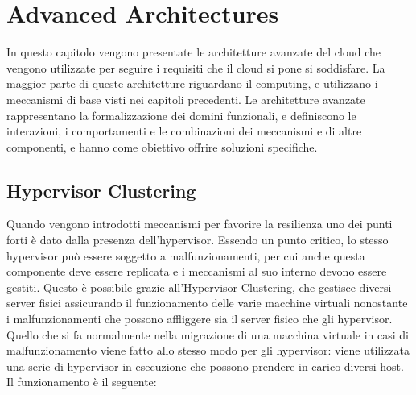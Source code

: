 \chapter{Advanced Architectures}
In questo capitolo vengono presentate le architetture avanzate del cloud che vengono utilizzate per seguire i requisiti che il cloud si pone si soddisfare. La maggior parte di queste architetture riguardano il computing, e utilizzano i meccanismi di base visti nei capitoli precedenti. Le architetture avanzate rappresentano la formalizzazione dei domini funzionali, e definiscono le interazioni, i comportamenti e le combinazioni dei meccanismi e di altre componenti, e hanno come obiettivo offrire soluzioni specifiche.

\section{Hypervisor Clustering}
Quando vengono introdotti meccanismi per favorire la resilienza uno dei punti forti è dato dalla presenza dell'hypervisor. Essendo un punto critico, lo stesso hypervisor può essere soggetto a malfunzionamenti, per cui anche questa componente deve essere replicata e i meccanismi al suo interno devono essere gestiti. Questo è possibile grazie all'Hypervisor Clustering, che gestisce diversi server fisici assicurando il funzionamento delle varie macchine virtuali nonostante i malfunzionamenti che possono affliggere sia il server fisico che gli hypervisor. Quello che si fa normalmente nella migrazione di una macchina virtuale in casi di malfunzionamento viene fatto allo stesso modo per gli hypervisor: viene utilizzata una serie di hypervisor in esecuzione che possono prendere in carico diversi host. Il funzionamento è il seguente:
